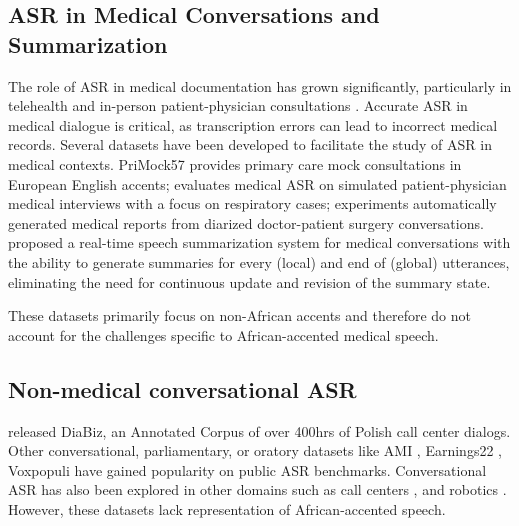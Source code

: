 \subsection{ASR in Medical Conversations and Summarization}
The role of ASR in medical documentation has grown significantly, particularly in telehealth and in-person patient-physician consultations \cite{korfiatis2022primock57, galloway2024impact, michalopoulos2022medicalsum, yim2023aci}. Accurate ASR in medical dialogue is critical, as transcription errors can lead to incorrect medical records. Several datasets have been developed to facilitate the study of ASR in medical contexts. PriMock57 \cite{korfiatis2022primock57} provides primary care mock consultations in European English accents; 
\citet{fareez2022dataset} evaluates medical ASR on simulated patient-physician medical interviews with a focus on respiratory cases; \citet{enarvi2020generating} experiments automatically generated medical reports from diarized doctor-patient surgery conversations. %
\citet{le2024real} proposed a real-time speech summarization system for medical conversations with the ability to generate summaries for every (local) and end of (global) utterances, eliminating the need for continuous update and revision of the summary state. 

These datasets primarily focus on non-African accents and therefore do not account for the challenges specific to African-accented medical speech.

\subsection{Non-medical conversational ASR} 
\citet{pkezik2022diabiz} released DiaBiz, an Annotated Corpus of over 400hrs of Polish call center dialogs. Other conversational, parliamentary, or oratory datasets like AMI \cite{carletta2005ami}, Earnings22 \cite{del2022earnings}, Voxpopuli \cite{wang-etal-2021-voxpopuli} have gained popularity on public ASR benchmarks. Conversational ASR has also been explored in other domains such as call centers \citep{plaza2021call}, and robotics \citep{skantze2021turn}. However, these datasets lack representation of African-accented speech.

